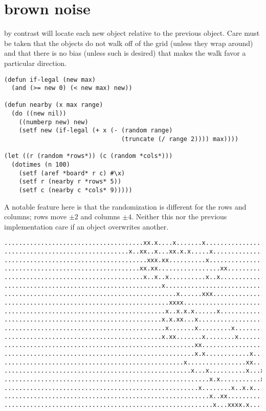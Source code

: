 \documentclass[12pt,a4paper]{article}
\begin{document}
\section*{brown noise}

by contrast will locate each new object relative to the previous object.
Care must be taken that the objects do not walk off of the grid (unless
they wrap around) and that there is no bias (unless such is desired)
that makes the walk favor a particular direction.

\begin{verbatim}
(defun if-legal (new max)
  (and (>= new 0) (< new max) new))

(defun nearby (x max range)
  (do ((new nil))
    ((numberp new) new)
    (setf new (if-legal (+ x (- (random range)
                                (truncate (/ range 2)))) max))))

(let ((r (random *rows*)) (c (random *cols*)))
  (dotimes (n 100)
    (setf (aref *board* r c) #\x)
    (setf r (nearby r *rows* 5))
    (setf c (nearby c *cols* 9)))))
\end{verbatim}

A notable feature here is that the randomization is different for the
rows and columns; rows move $\pm 2$ and columns $\pm 4$. Neither this
nor the previous implementation care if an object overwrites another.

\begin{verbatim}
......................................xx.x....x.......x.................
..................................x..xx..x...xx.x.x.....x...............
.......................................xxx.xx..........x................
.....................................xx.xx.................xx...........
......................................x..x..x..........x..x.............
...........................................x............................
...............................................x......xxx...............
.............................................xxxx.......................
............................................x..x.x.x......x.............
...........................................x.x.xx...x...................
............................................x.......x.........x.........
...........................................x.xx.......x........x........
....................................................xx..................
....................................................x.x............x....
.................................................x................xx....
...................................................x...x..........x...x.
........................................................x.x...........x.
.....................................................x........x..x.x....
........................................................x..xx...........
.........................................................x...xxxx.x.....
\end{verbatim}
\end{document}
